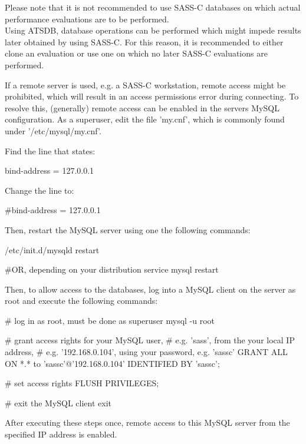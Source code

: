 Please note that it is not recommended to use SASS-C databases on which actual performance evaluations are to be performed. \\
Using ATSDB, database operations can be performed which might impede results later obtained by using SASS-C. For this reason, it is recommended to either clone an evaluation or use one on which no later SASS-C evaluations are performed.

If a remote server is used, e.g. a SASS-C workstation, remote access might be prohibited, which will result in an access permissions error during connecting. To resolve this, (generally) remote access can be enabled in the servers MySQL configuration. As a superuser, edit the file 'my.cnf', which is commonly found under '/etc/mysql/my.cnf'. 

Find the line that states:
\begin{cverbatim}
bind-address = 127.0.0.1
\end{cverbatim}

Change the line to:

\begin{cverbatim}
#bind-address = 127.0.0.1
\end{cverbatim}

Then, restart the MySQL server using one the following commands:

\begin{cverbatim}
/etc/init.d/mysqld restart

#OR, depending on your distribution
service mysql restart
\end{cverbatim}

Then, to allow access to the databases, log into a MySQL client on the server as root and execute the following commands:

\begin{cverbatim}
# log in as root, must be done as superuser
mysql -u root

# grant access rights for your MySQL user, 
# e.g. 'sass', from the your local IP address, 
# e.g. '192.168.0.104', using your password, e.g. 'sassc'
GRANT ALL ON *.* to 'sassc'@'192.168.0.104' IDENTIFIED BY 'sassc';

# set access rights
FLUSH PRIVILEGES;

# exit the MySQL client
exit
\end{cverbatim}

After executing these steps once, remote access to this MySQL server from the specified IP address is enabled.


